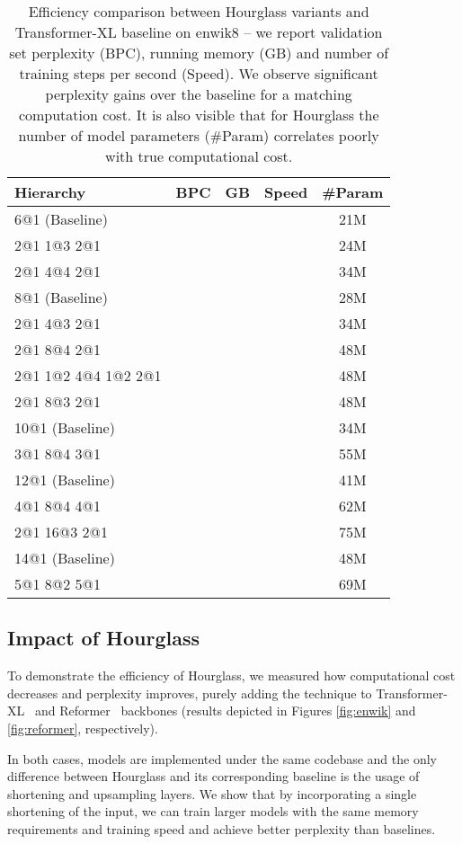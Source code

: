 \documentclass[11pt]{article}
\begin{document}
\begin{table}[ht!]
\small
\centering
\setlength{\tabcolsep}{0.35em}
\begin{tabular}{lcccc}
\hline
Hierarchy & BPC & GB & Speed & \#Param \\
\hline
6@1 (Baseline) &  &  &  & 21M\\
2@1 1@3 2@1 &  &  &  & 24M\\
2@1 4@4 2@1 &  &  &  & 34M\\
\hline
8@1 (Baseline) &  &  &  & 28M\\
2@1 4@3 2@1 &  &  &  & 34M\\
2@1 8@4 2@1 &  &  &  & 48M\\
2@1 1@2 4@4 1@2 2@1 &  &  &  & 48M\\ 
2@1 8@3 2@1 &  &  &  & 48M\\
\hline
10@1 (Baseline) &  &  &  & 34M\\
3@1 8@4 3@1 &  &  &  & 55M\\
\hline
12@1 (Baseline) &  &  &  & 41M\\
4@1 8@4 4@1 &  &  &  & 62M\\
2@1 16@3 2@1 &  &  &  & 75M\\
\hline
14@1 (Baseline) &  &  &  & 48M\\
5@1 8@2 5@1 &  &  &   & 69M\\
\hline
\end{tabular}
\caption{Efficiency comparison between Hourglass variants and Transformer-XL baseline on enwik8 -- we report validation set perplexity (BPC), running memory (GB) and number of training steps per second (Speed). We observe significant perplexity gains over the baseline for a matching computation cost. It is also visible that for Hourglass the number of model parameters (\#Param) correlates poorly with true computational cost. }
\label{tab:memspeed}
\end{table}


\subsection{Impact of Hourglass}\label{sec:hourglassapplication}
To demonstrate the efficiency of Hourglass, we measured how computational cost decreases and perplexity improves, purely adding the technique to Transformer-XL~\cite{dai2019transformerxl} and Reformer~\cite{kitaev2020reformer} backbones (results depicted in Figures \ref{fig:enwik} and \ref{fig:reformer}, respectively).

In both cases, models are implemented under the same codebase and the only difference between Hourglass and its corresponding baseline is the usage of shortening and upsampling layers. We show that by incorporating a single shortening of the input, we can train larger models with the same memory requirements and training speed and achieve better perplexity than baselines.
\end{document}
